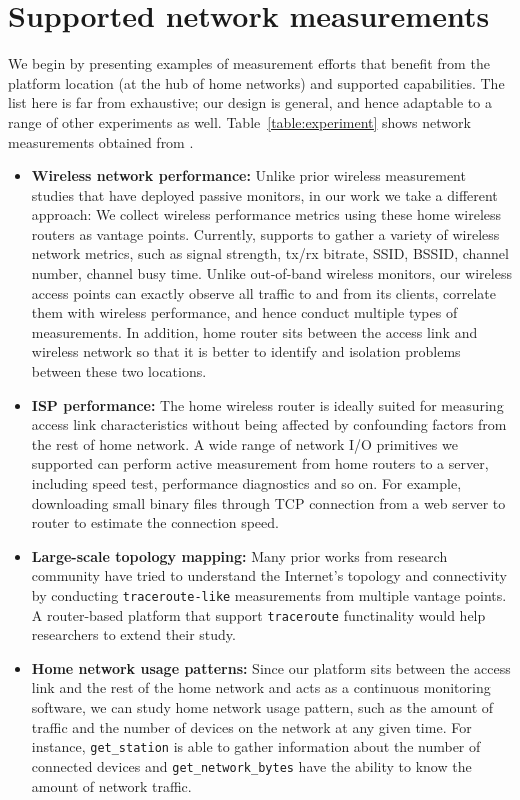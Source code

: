 {\section{Supported network measurements}
\label{sec.network_measurement}
We begin by presenting examples of measurement efforts that benefit from the platform location (at the hub of home networks) and supported capabilities. The list here is far from exhaustive; our design is general, and hence adaptable to a range of other experiments as well. Table~\ref{table:experiment} shows network measurements obtained from \sysname.

\begin{itemize}
\item \textbf{Wireless network performance:} Unlike prior wireless measurement studies that have deployed passive monitors\cite{mahajan2006analyzing}\cite{raghavendra2009wi}\cite{papagiannaki2006experimental}, in our work we take a different approach: We collect wireless performance metrics using these home wireless routers as vantage points. Currently, \sysname supports to gather a variety of wireless network metrics, such as signal strength, tx/rx bitrate, SSID, BSSID, channel number, channel busy time.  Unlike out-of-band wireless monitors, our wireless access points can exactly observe all traffic to and from its clients, correlate them with wireless performance, and hence conduct multiple types of measurements. In addition, home router sits between the access link and wireless network so that it is better to identify and isolation problems between these two locations.

\item \textbf{ISP performance:} The home wireless router is ideally suited for measuring access link characteristics without being affected by confounding factors from the rest of home network. A wide range of network I/O primitives we supported can perform active measurement from home routers to a server, including speed test, performance diagnostics and so on. For example, downloading small binary files through TCP connection from a web server to router to estimate the connection speed.

\item \textbf{Large-scale topology mapping:} Many prior works from research community have tried to understand the Internet's topology and connectivity by conducting \texttt{traceroute-like} measurements from multiple vantage points.\cite{paxson1996end}\cite{chen2009sidewalk} A router-based platform that support \texttt{traceroute} functinality would help researchers to extend their study.

\item \textbf{Home network usage patterns:} Since our platform sits between the access link and the rest of the home network and acts as a continuous monitoring software, we can study home network usage pattern, such as the amount of traffic and the number of devices on the network at any given time. For instance, \texttt{get\_station} is able to gather information about the number of connected devices and \texttt{get\_network\_bytes} have the ability to know the amount of network traffic.    
\end{itemize} 
\par}
